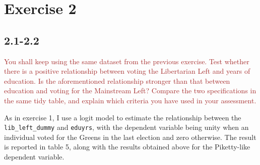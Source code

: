 \documentclass[
]{article}
\begin{document}
\hypertarget{exercise-2}{%
\section{Exercise 2}\label{exercise-2}}

\hypertarget{section-3}{%
\subsection{2.1-2.2}\label{section-3}}

\textcolor{brown}{You shall keep using the same dataset from the previous exercise. Test whether there is a positive relationship between voting the Libertarian Left and years of education. Is the aforementioned relationship stronger than that between education and voting for the Mainstream Left? Compare the two specifications in the same tidy table, and explain which criteria you have used in your assessment.}

As in exercise 1, I use a logit model to estimate the relationship
between the \texttt{lib\_left\_dummy} and \texttt{eduyrs}, with the
dependent variable being unity when an individual voted for the Greens
in the last election and zero otherwise. The result is reported in table
5, along with the results obtained above for the Piketty-like dependent
variable.
\end{document}
